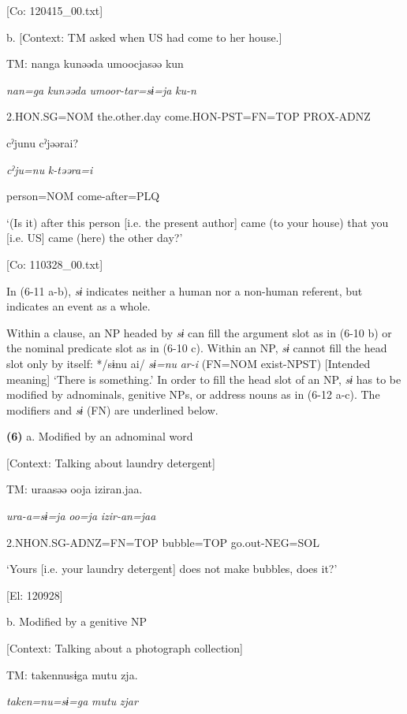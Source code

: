       [Co: 120415\_00.txt]

  b.  [Context: TM asked when US had come to her house.]

    TM:  nanga  kunəəda  umoocjasəə  kun

      \textit{nan=ga}  \textit{kunəəda}  \textit{umoor-tar=sɨ=ja}  \textit{ku-n}

      2.HON.SG=NOM  the.other.day  come.HON-PST=FN=TOP  PROX-ADNZ

      cˀjunu  cˀjəərai?

      \textit{cˀju=nu}  \textit{k-təəra=i}

      person=NOM  come-after=PLQ

      ‘(Is it) after this person [i.e. the present author] came (to your house) that you [i.e. US] came (here) the other day?’

      [Co: 110328\_00.txt]

In (6-11 a-b), \textit{sɨ} indicates neither a human nor a non-human referent, but indicates an event as a whole.

  Within a clause, an NP headed by \textit{sɨ} can fill the argument slot as in (6-10 b) or the nominal predicate slot as in (6-10 c). Within an NP, \textit{sɨ} cannot fill the head slot only by itself: */sɨnu ai/ \textit{sɨ=nu} \textit{ar-i} (FN=NOM exist-NPST) [Intended meaning] ‘There is something.’ In order to fill the head slot of an NP, \textit{sɨ} has to be modified by adnominals, genitive NPs, or address nouns as in (6-12 a-c). The modifiers and \textit{sɨ} (FN) are underlined below.

\textbf{(6)}  a.  Modified by an adnominal word

    [Context: Talking about laundry detergent]

    TM:  uraasəə  ooja  iziran.jaa.

      \textit{ura-a=sɨ=ja}  \textit{oo=ja}  \textit{izir-an=jaa}

      2.NHON.SG-ADNZ=FN=TOP  bubble=TOP  go.out-NEG=SOL

      ‘Yours [i.e. your laundry detergent] does not make bubbles, does it?’

      [El: 120928]

  b.  Modified by a genitive NP

    [Context: Talking about a photograph collection]

    TM:  {\textbar}taken{\textbar}nusɨga  mutu  zja.

      \textit{taken=nu=sɨ=ga}  \textit{mutu}  \textit{zjar}

